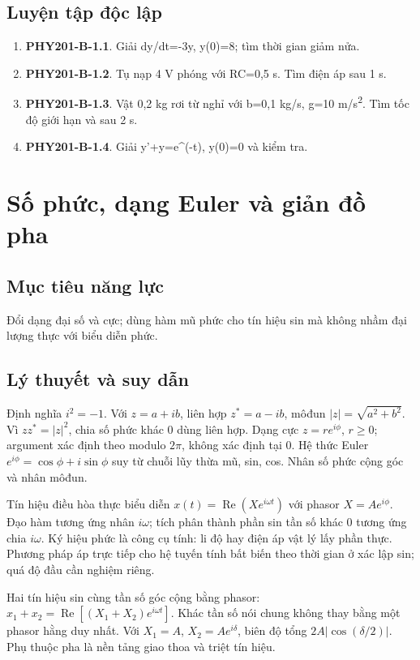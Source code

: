 \documentclass[11pt,a4paper,openany]{book}
\begin{document}
\section{Luyện tập độc lập}
\begin{enumerate}
\item \textbf{PHY201-B-1.1}. Giải dy/dt=-3y, y(0)=8; tìm thời gian giảm nửa.
\item \textbf{PHY201-B-1.2}. Tụ nạp 4 V phóng với RC=0,5 s. Tìm điện áp sau 1 s.
\item \textbf{PHY201-B-1.3}. Vật 0,2 kg rơi từ nghỉ với b=0,1 kg/s, g=10 m/s\textsuperscript{2}. Tìm tốc độ giới hạn và sau 2 s.
\item \textbf{PHY201-B-1.4}. Giải y'+y=e^(-t), y(0)=0 và kiểm tra.
\end{enumerate}
\chapter{Số phức, dạng Euler và giản đồ pha}
\section{Mục tiêu năng lực}
Đổi dạng đại số và cực; dùng hàm mũ phức cho tín hiệu sin mà không nhầm đại lượng thực với biểu diễn phức.
\section{Lý thuyết và suy dẫn}
Định nghĩa $i^2=-1$. Với $z=a+ib$, liên hợp $z^*=a-ib$, môđun $|z|=\sqrt{a^2+b^2}$. Vì $zz^*=|z|^2$, chia số phức khác 0 dùng liên hợp. Dạng cực $z=re^{i\phi}$, $r\ge0$; argument xác định theo modulo $2\pi$, không xác định tại 0. Hệ thức Euler $e^{i\phi}=\cos\phi+i\sin\phi$ suy từ chuỗi lũy thừa mũ, sin, cos. Nhân số phức cộng góc và nhân môđun.

Tín hiệu điều hòa thực biểu diễn $x(t)=\operatorname{Re}(Xe^{i\omega t})$ với phasor $X=Ae^{i\phi}$. Đạo hàm tương ứng nhân $i\omega$; tích phân thành phần sin tần số khác 0 tương ứng chia $i\omega$. Ký hiệu phức là công cụ tính: li độ hay điện áp vật lý lấy phần thực. Phương pháp áp trực tiếp cho hệ tuyến tính bất biến theo thời gian ở xác lập sin; quá độ đầu cần nghiệm riêng.

Hai tín hiệu sin cùng tần số góc cộng bằng phasor: $x_1+x_2=\operatorname{Re}[(X_1+X_2)e^{i\omega t}]$. Khác tần số nói chung không thay bằng một phasor hằng duy nhất. Với $X_1=A$, $X_2=Ae^{i\delta}$, biên độ tổng $2A|\cos(\delta/2)|$. Phụ thuộc pha là nền tảng giao thoa và triệt tín hiệu.
\begin{center}
\end{center}
\end{document}
